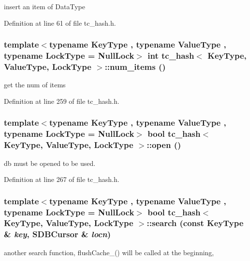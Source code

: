 insert an item of DataType 

Definition at line 61 of file tc\_\-hash.h.\hypertarget{classtc__hash_51837772025d390b3a9b1c87ec15309d}{
\subsubsection[{num\_\-items}]{\setlength{\rightskip}{0pt plus 5cm}template$<$typename KeyType , typename ValueType , typename LockType  = NullLock$>$ int {\bf tc\_\-hash}$<$ KeyType, ValueType, LockType $>$::num\_\-items ()}}
\label{classtc__hash_51837772025d390b3a9b1c87ec15309d}


get the num of items 

Definition at line 259 of file tc\_\-hash.h.\hypertarget{classtc__hash_782627d77d2ef0bab952c38992c5c743}{
\subsubsection[{open}]{\setlength{\rightskip}{0pt plus 5cm}template$<$typename KeyType , typename ValueType , typename LockType  = NullLock$>$ bool {\bf tc\_\-hash}$<$ KeyType, ValueType, LockType $>$::open ()}}
\label{classtc__hash_782627d77d2ef0bab952c38992c5c743}


db must be opened to be used. 

Definition at line 267 of file tc\_\-hash.h.\hypertarget{classtc__hash_57246a88334c225644111bbf0a127e8e}{
\subsubsection[{search}]{\setlength{\rightskip}{0pt plus 5cm}template$<$typename KeyType , typename ValueType , typename LockType  = NullLock$>$ bool {\bf tc\_\-hash}$<$ KeyType, ValueType, LockType $>$::search (const KeyType \& {\em key}, \/  SDBCursor \& {\em locn})}}
\label{classtc__hash_57246a88334c225644111bbf0a127e8e}


another search function, flushCache\_\-() will be called at the beginning, 

